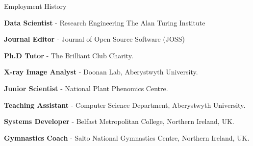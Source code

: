 \begin{rubric}{Employment History}


	\textbf{Data Scientist} - Research Engineering The Alan Turing Institute

	\textbf{Journal Editor} - Journal of Open Source Software (JOSS)

\entry*[2019 -- 2022]%
	\textbf{Ph.D Tutor} - The Brilliant Club Charity.

\entry*[2017 -- 2018]%
	\textbf{X-ray Image Analyst} - Doonan Lab, Aberystwyth University.

\entry*[2016 -- 2017]%
	\textbf{Junior Scientist} - National Plant Phenomics Centre.

\entry*[2015 -- 2018]%
	\textbf{Teaching Assistant} - Computer Science Department, Aberystwyth
	University.
	
\entry*[2013 -- 2014]%
	\textbf{Systems Developer} - Belfast Metropolitan College, Northern Ireland, UK.

\entry*[2013 -- 2014]%
	\textbf{Gymnastics Coach} - Salto National Gymnastics Centre, Northern Ireland, UK.
%
\end{rubric}